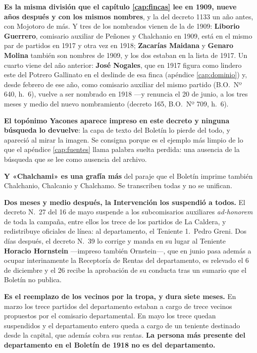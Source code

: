 \textbf{Es la misma división que el capítulo \ref{cap:fincas} lee en 1909, nueve años después y
con los mismos nombres}, y la del decreto 1133 un año antes, con Mojotoro de más. Y tres de los
nombrados vienen de la de 1909: \textbf{Liborio Guerrero}, comisario auxiliar
de Peñones y Chalchanio en 1909, está en el mismo par de partidos en 1917 y otra vez en 1918;
\textbf{Zacarías Maidana} y \textbf{Genaro Molina} también son nombres de 1909, y los dos estaban
en la lista de 1917. Un cuarto viene del año anterior: \textbf{José Nogales}, que en 1917 figura como
lindero este del Potrero Gallinato en el deslinde de esa finca (apéndice \ref{cap:dominio}) y, desde
febrero de ese año, como comisario auxiliar del mismo partido (B.O.\ Nº 640, h.\ 6), vuelve a ser
nombrado en 1918 ---y renuncia el 20 de junio, a los tres meses y medio del nuevo nombramiento
(decreto 165, B.O.\ Nº 709, h.\ 6).

\begin{cautela}
\textbf{El topónimo Yacones aparece impreso en este decreto y ninguna búsqueda lo devuelve}: la
capa de texto del Boletín lo pierde del todo, y apareció al mirar la imagen. Se consigna porque
es el ejemplo más limpio de lo que el apéndice \ref{cap:fuentes} llama palabra suelta perdida:
una ausencia de la búsqueda que se lee como ausencia del archivo.

\textbf{Y «Chalchami» es una grafía más} del paraje que el Boletín imprime también Chalchanio,
Chalcanio y Chalchamo. Se transcriben todas y no se unifican.
\end{cautela}

\textbf{Dos meses y medio después, la Intervención los suspendió a todos.} El decreto N.\ 27 del
16 de mayo suspende a los subcomisarios auxiliares \textit{ad-honorem} de toda la campaña, entre
ellos los trece de los partidos de La Caldera, y redistribuye oficiales de línea: al
departamento, el Teniente 1.\ Pedro Greni. Dos días después, el decreto N.\ 39 lo corrige y manda
en su lugar al Teniente \textbf{Horacio Hornstein} ---impreso también Ornstein---, que en junio
pasa además a ocupar interinamente la Receptoría de Rentas del departamento, es relevado el 6 de
diciembre y el 26 recibe la aprobación de su conducta tras un sumario que el Boletín no publica.

\begin{cautela}
\textbf{Es el reemplazo de los vecinos por la tropa, y dura siete meses.} En marzo los trece
partidos del departamento estaban a cargo de trece vecinos propuestos por el comisario
departamental. En mayo los trece quedan suspendidos y el departamento entero queda a cargo de un
teniente destinado desde la capital, que además cobra sus rentas. \textbf{La persona más presente
del departamento en el Boletín de 1918 no es del departamento.}
\end{cautela}

